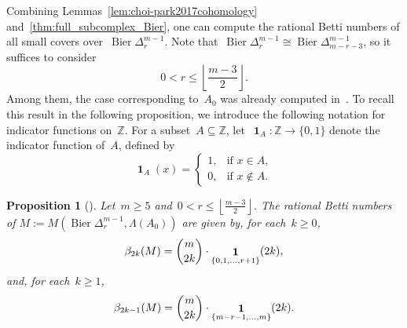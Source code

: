 \documentclass[11pt]{amsart}
\theoremstyle{plain}
\newtheorem{proposition}[theorem]{Proposition}
\numberwithin{equation}{section}
\theoremstyle{definition}
\newcommand{\Z}{\mathbb{Z}}
\DeclareMathOperator{\Bier}{Bier}
\DeclareMathOperator{\ind}{\mathbf{1}}
\begin{document}
Combining Lemmas~\ref{lem:choi-park2017cohomology} and~\ref{thm:full_subcomplex_Bier}, one can compute the rational Betti numbers of all small covers over~$\Bier\Delta_r^{m-1}$.
Note that~$\Bier\Delta_r^{m-1} \cong\Bier\Delta_{m-r-3}^{m-1}$, so it suffices to consider
$$
0< r\leq \left\lfloor\frac{m-3}{2}\right\rfloor.
$$
Among them, the case corresponding to~$A_0$ was already computed in~\cite{Choi-Yoon-Yu2026}.
To recall this result in the following proposition, we introduce the following notation for indicator functions on~$\Z$.
For a subset~$A\subseteq \Z$, let~$\ind_A\colon \Z \to \{0,1\}$ denote the indicator function of~$A$, defined by
$$
    \ind_A(x)= 
        \begin{cases}
            1, & \text{if } x \in A,\\
            0, & \text{if } x \notin A.
        \end{cases}
$$


\begin{proposition}[\cite{Choi-Yoon-Yu2026}]\label{prop:Bettisk}
Let~$m\geq 5$ and~$0< r \leq \left\lfloor\frac{m-3}{2}\right\rfloor$.
The rational Betti numbers of $M:=M(\Bier\Delta^{m-1}_r,\Lambda(A_0))$ are given by, for each~$k \geq 0$,
$$
    \beta_{2k}(M) = \dbinom{m}{2k} \cdot \ind_{\{0,1,\ldots,r+1\}}(2k),
$$
and, for each~$k \geq 1$,
$$
    \beta_{2k-1}(M) = \dbinom{m}{2k} \cdot \ind_{\{m-r-1,\ldots,m\}}(2k).
$$
\end{proposition}
\end{document}
